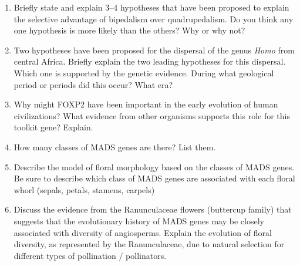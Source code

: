 \documentclass[letterpaper]{tufte-handout}
\begin{document}
\begin{enumerate}
	\item Briefly state and explain 3--4 hypotheses that have been proposed to explain the selective advantage of bipedalism over quadrupedalism.  Do you think any one hypothesis is more likely than the others?  Why or why not?

	\item Two hypotheses have been proposed for the dispersal of the genus \textit{Homo} from central Africa.  Briefly explain the two leading hypotheses for this dispersal.  Which one is supported by the genetic evidence.  During what geological period or periods did this occur? What era?

	\item Why might FOXP2 have been important in the early evolution of human civilizations?  What evidence from other organisms supports this role for this toolkit gene? Explain.

	\item How many classes of MADS genes are there?  List them.

	\item Describe the model of floral morphology based on the classes of MADS genes.  Be sure to describe which class of MADS genes are associated with each floral whorl (sepals, petals, stamens, carpels)

	\item Discuss the evidence from the Ranunculaceae flowers (buttercup family) that suggests that the evolutionary history of MADS genes may be closely associated with diversity of angiosperms.  Explain the evolution of floral diversity, as represented by the Ranunculaceae, due to natural selection for different types of pollination / pollinators.

\end{enumerate}
\end{document}

